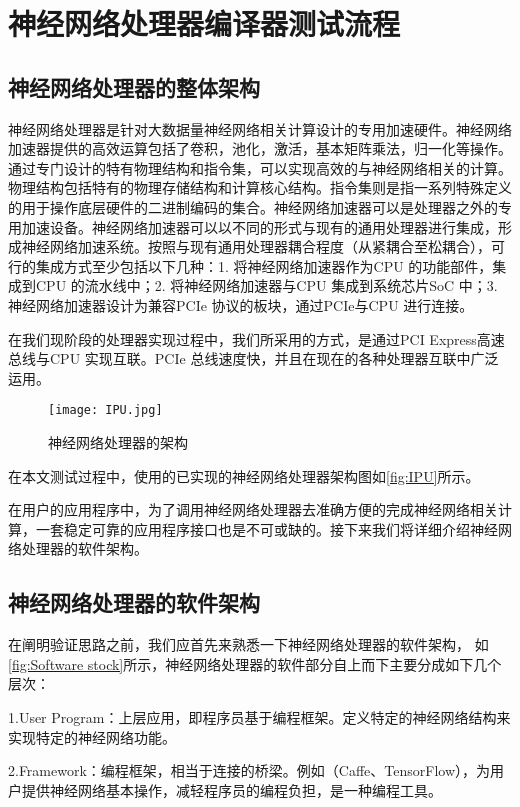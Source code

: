 \chapter{神经网络处理器编译器测试流程}
\section{神经网络处理器的整体架构}
神经网络处理器是针对大数据量神经网络相关计算设计的专用加速硬件。神经网络加速器提供的高效运算包括了卷积，池化，激活，基本矩阵乘法，归一化等操作。通过专门设计的特有物理结构和指令集，可以实现高效的与神经网络相关的计算。物理结构包括特有的物理存储结构和计算核心结构。指令集则是指一系列特殊定义的用于操作底层硬件的二进制编码的集合。神经网络加速器可以是处理器之外的专用加速设备。神经网络加速器可以以不同的形式与现有的通用处理器进行集成，形成神经网络加速系统。按照与现有通用处理器耦合程度（从紧耦合至松耦合），可行的集成方式至少包括以下几种：1. 将神经网络加速器作为CPU 的功能部件，集成到CPU 的流水线中；2. 将神经网络加速器与CPU 集成到系统芯片SoC 中；3. 神经网络加速器设计为兼容PCIe 协议的板块，通过PCIe与CPU 进行连接。

在我们现阶段的处理器实现过程中，我们所采用的方式，是通过PCI Express高速总线与CPU 实现互联。PCIe 总线速度快，并且在现在的各种处理器互联中广泛运用。

\begin{figure}[!htbp]
\centering
\texttt{[image: IPU.jpg]}
\caption{神经网络处理器的架构}
\label{fig:IPU}
\end{figure}

在本文测试过程中，使用的已实现的神经网络处理器架构图如\autoref{fig:IPU}所示。

在用户的应用程序中，为了调用神经网络处理器去准确方便的完成神经网络相关计算，一套稳定可靠的应用程序接口也是不可或缺的。接下来我们将详细介绍神经网络处理器的软件架构。

\section{神经网络处理器的软件架构}
在阐明验证思路之前，我们应首先来熟悉一下神经网络处理器的软件架构， 如\autoref{fig:Software stock}所示，神经网络处理器的软件部分自上而下主要分成如下几个层次：

1.User Program：上层应用，即程序员基于编程框架。定义特定的神经网络结构来实现特定的神经网络功能。

2.Framework：编程框架，相当于连接的桥梁。例如（Caffe、TensorFlow），为用户提供神经网络基本操作，减轻程序员的编程负担，是一种编程工具。

